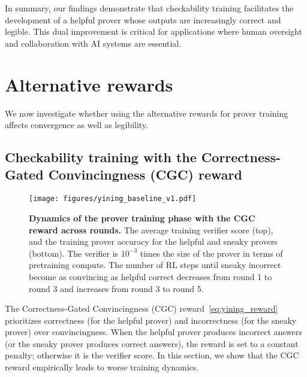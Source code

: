 \documentclass{article}
\begin{document}
In summary, our findings demonstrate that checkability training facilitates the development of a helpful prover whose outputs are increasingly correct and legible. This dual improvement is critical for applications where human oversight and collaboration with AI systems are essential.

\section{Alternative rewards}
\label{sec:ablations}

We now investigate whether using the alternative rewards for prover training affects convergence as well as legibility.

\subsection{Checkability training with the Correctness-Gated Convincingness (CGC) reward}
\label{sec:yining_reward}

\begin{figure}
    \centering
    \texttt{[image: figures/yining\_baseline\_v1.pdf]}
    \caption{\textbf{Dynamics of the prover training phase with the CGC reward across rounds.} The average training verifier score (top), and the training prover accuracy for the helpful and sneaky provers (bottom). The verifier is $10^{-3}$ times the size of the prover in terms of pretraining compute. The number of RL steps until sneaky incorrect become as convincing as helpful correct decreases from round 1 to round 3 and increases from round 3 to round 5.}
    \label{fig:yining_reward}
\end{figure}

The Correctness-Gated Convincingness (CGC) reward~\eqref{eq:yining_reward} prioritizes correctness (for the helpful prover) and incorrectness (for the sneaky prover) over convincingness. When the helpful prover produces incorrect answers (or the sneaky prover produces correct answers), the reward is set to a constant penalty; otherwise it is the verifier score. In this section, we show that the CGC reward empirically leads to worse training dynamics.
\end{document}
